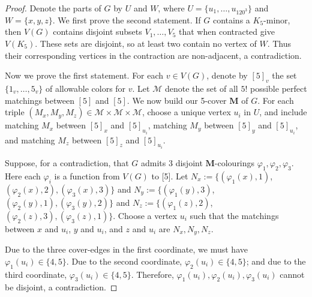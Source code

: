 \documentclass[10pt,a4paper]{amsart}
\newcommand\MM{\textbf{M}}
\newcommand\vph{\varphi}
\begin{document}
\begin{proof}
	Denote the parts of $G$ by $U$ and $W$, where $U=\{u_1,\ldots,u_{120^3}\}$ and $W=\{x,y,z\}$.
	We first prove the second statement.  If $G$ contains a $K_5$-minor, then $V(G)$ contains
	disjoint subsets $V_1,\ldots,V_5$ that when contracted give $V(K_5)$.
	These sets are disjoint, so at least two contain no vertex of $W$.  Thus their corresponding
	vertices in the contraction are non-adjacent, a contradiction.

	Now we prove the first statement.
	For each $v\in V(G)$, denote by $[5]_v$ the set $\{1_v,\ldots,5_v\}$ of allowable colors for $v$.
	Let $\mathcal{M}$ denote the set of all $5!$ possible perfect matchings between $[5]$ and $[5]$.
%
	We now build our 5-cover $\MM$ of $G$.
	For each triple $(M_x,M_y,M_z) \in \mathcal{M}\times\mathcal{M}\times\mathcal{M}$, choose a unique 
	vertex $u_i$ in $U$, and include matching $M_x$ between $[5]_x$ and $[5]_{u_i}$, 
	matching $M_y$ between $[5]_y$ and $[5]_{u_i}$, and matching $M_z$ between $[5]_z$ and $[5]_{u_i}$.


	Suppose, for a contradiction, that $G$ admits 3 disjoint $\MM$-colourings 
	$\vph_1, \vph_2, \vph_3$.  Here each $\vph_i$ is a function from $V(G)$ to [5].
%
	Let
	$N_x := \{(\vph_1(x),1)$, $(\vph_2(x),2),(\vph_3(x),3)\}$ and
	$N_y := \{(\vph_1(y),3)$, $(\vph_2(y),1),(\vph_3(y),2)\}$ and
	$N_z := \{(\vph_1(z),2)$, $(\vph_2(z),3),(\vph_3(z),1)\}$.
	Choose a vertex $u_i$ such that the matchings between 
	$x$ and $u_i$, $y$ and $u_i$, and $z$ and $u_i$ are $N_x, N_y, N_z$.

Due to the three cover-edges in the first coordinate, we must have $\vph_1(u_i) \in \{4,5\}$.
Due to the second coordinate, $\vph_2(u_i) \in \{4,5\}$; and due to the third coordinate, $\vph_3(u_i) \in \{4,5\}$.  Therefore, $\vph_1(u_i),\vph_2(u_i),\vph_3(u_i)$ cannot be disjoint, a contradiction. 
\end{proof}
\end{document}
